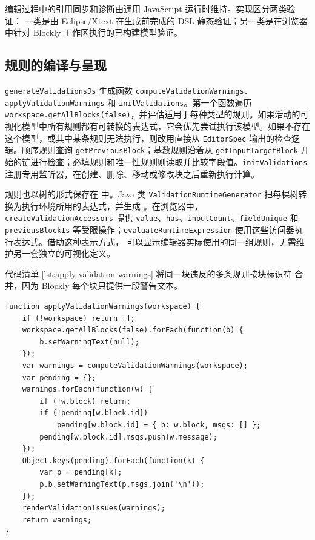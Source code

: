 编辑过程中的引用同步和诊断由通用 JavaScript 运行时维持。实现区分两类验证：
一类是由 Eclipse/Xtext 在生成前完成的 DSL 静态验证；另一类是在浏览器中针对
Blockly 工作区执行的已构建模型验证。

\subsection{规则的编译与呈现}

\texttt{generateValidations}\allowbreak\texttt{Js} 生成函数 \texttt{computeValidation}\allowbreak\texttt{Warnings}、\texttt{applyValidation}\allowbreak\texttt{Warnings} 和 \texttt{init}\allowbreak\texttt{Validations}。第一个函数遍历 \texttt{workspace.}\allowbreak\texttt{getAllBlocks(false)}，并评估适用于每种类型的规则。如果活动的可视化模型中所有规则都有可转换的表达式，它会优先尝试执行该模型。如果不存在这个模型，或其中某条规则无法执行，则改用直接从 \texttt{EditorSpec} 输出的检查逻辑。顺序规则查询 \texttt{getPrevious}\allowbreak\texttt{Block}；基数规则沿着从 \texttt{getInputTarget}\allowbreak\texttt{Block} 开始的链进行检查；必填规则和唯一性规则则读取并比较字段值。\texttt{initValidations} 注册专用监听器，在创建、删除、移动或修改块之后重新执行计算。

规则也以树的形式保存在  中。Java 类
\texttt{ValidationRuntime}\allowbreak\texttt{Generator} 把每棵树转换为执行环境所用的表达式，并生成 。在浏览器中，\texttt{createValidation}\allowbreak\texttt{Accessors} 提供 \texttt{value}、\texttt{has}、\texttt{inputCount}、\texttt{fieldUnique} 和 \texttt{previousBlockIs} 等受限操作；\texttt{evaluateRuntime}\allowbreak\texttt{Expression} 使用这些访问器执行表达式。借助这种表示方式， 可以显示编辑器实际使用的同一组规则，无需维护另一套独立的可视化定义。

代码清单 \ref{lst:apply-validation-warnings} 将同一块违反的多条规则按块标识符
合并，因为 Blockly 每个块只提供一段警告文本。

\begin{lstlisting}[style=tfmjavascript, caption={验证警告的合并与呈现}, label={lst:apply-validation-warnings}]
function applyValidationWarnings(workspace) {
    if (!workspace) return [];
    workspace.getAllBlocks(false).forEach(function(b) {
        b.setWarningText(null);
    });
    var warnings = computeValidationWarnings(workspace);
    var pending = {};
    warnings.forEach(function(w) {
        if (!w.block) return;
        if (!pending[w.block.id])
            pending[w.block.id] = { b: w.block, msgs: [] };
        pending[w.block.id].msgs.push(w.message);
    });
    Object.keys(pending).forEach(function(k) {
        var p = pending[k];
        p.b.setWarningText(p.msgs.join('\n'));
    });
    renderValidationIssues(warnings);
    return warnings;
}
\end{lstlisting}

